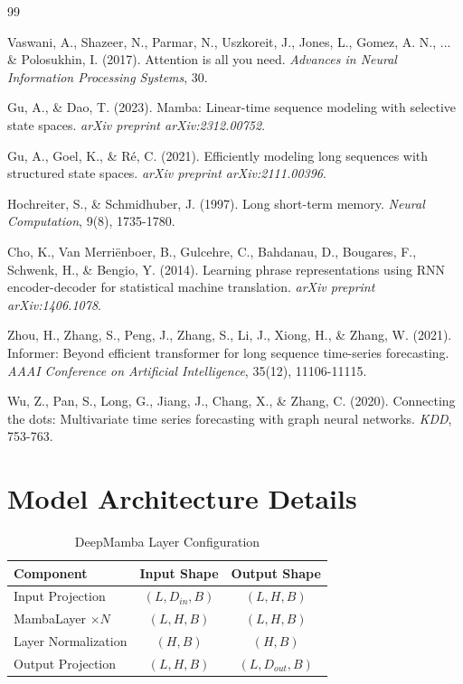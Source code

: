 \documentclass[11pt,a4paper]{article}
\begin{document}
\begin{thebibliography}{99}

Vaswani, A., Shazeer, N., Parmar, N., Uszkoreit, J., Jones, L., Gomez, A. N., ... \& Polosukhin, I. (2017). Attention is all you need. \textit{Advances in Neural Information Processing Systems}, 30.

Gu, A., \& Dao, T. (2023). Mamba: Linear-time sequence modeling with selective state spaces. \textit{arXiv preprint arXiv:2312.00752}.

Gu, A., Goel, K., \& Ré, C. (2021). Efficiently modeling long sequences with structured state spaces. \textit{arXiv preprint arXiv:2111.00396}.

Hochreiter, S., \& Schmidhuber, J. (1997). Long short-term memory. \textit{Neural Computation}, 9(8), 1735-1780.

Cho, K., Van Merriënboer, B., Gulcehre, C., Bahdanau, D., Bougares, F., Schwenk, H., \& Bengio, Y. (2014). Learning phrase representations using RNN encoder-decoder for statistical machine translation. \textit{arXiv preprint arXiv:1406.1078}.

Zhou, H., Zhang, S., Peng, J., Zhang, S., Li, J., Xiong, H., \& Zhang, W. (2021). Informer: Beyond efficient transformer for long sequence time-series forecasting. \textit{AAAI Conference on Artificial Intelligence}, 35(12), 11106-11115.

Wu, Z., Pan, S., Long, G., Jiang, J., Chang, X., \& Zhang, C. (2020). Connecting the dots: Multivariate time series forecasting with graph neural networks. \textit{KDD}, 753-763.

\end{thebibliography}

\appendix

\section{Model Architecture Details}

\begin{table}[H]
\centering
\caption{DeepMamba Layer Configuration}
\begin{tabular}{lcc}
\toprule
\textbf{Component} & \textbf{Input Shape} & \textbf{Output Shape} \\
\midrule
Input Projection & $(L, D_{in}, B)$ & $(L, H, B)$ \\
MambaLayer $\times N$ & $(L, H, B)$ & $(L, H, B)$ \\
Layer Normalization & $(H, B)$ & $(H, B)$ \\
Output Projection & $(L, H, B)$ & $(L, D_{out}, B)$ \\
\bottomrule
\end{tabular}
\end{table}
\end{document}
